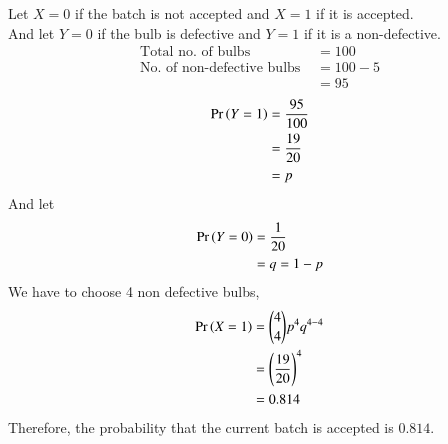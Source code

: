 Let $X=0 $ if the batch is not accepted and $X=1 $ if it is accepted. \\
And let $Y=0 $ if the bulb is defective and $Y=1 $ if it is a non-defective.
\begin{align}
    \text{Total no. of bulbs } &= 100  \\
      \text{No. of non-defective bulbs }  &= 100 -5 \\
                                           &=95 
\end{align}
\begin{align}
    \Pr\left(Y=1\right) &= \frac{95}{100} \\
                  & = \frac{19}{20}  \\
                  &= p
\end{align}
And let 
\begin{align}
    \Pr\left(Y=0\right) &= \frac{1}{20} \\
    &= q = 1-p
\end{align}
We have to choose 4 non defective bulbs,
\begin{align}
    \Pr\left(X=1\right) &= {4\choose 4} p^4 q^{4-4} \\
    &= \left(\frac{19}{20}\right)^4 \\
    &= 0.814
\end{align}
Therefore, the probability that the current batch is accepted is $0.814 $.